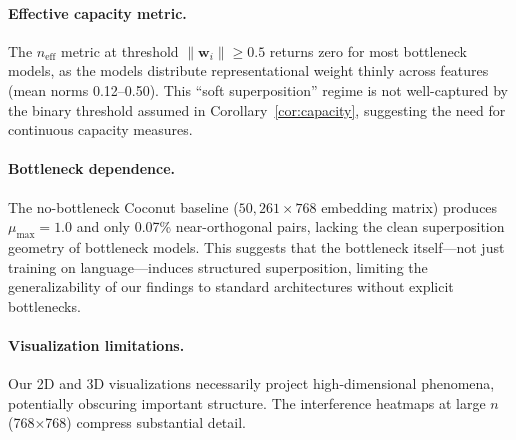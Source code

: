 \paragraph{Effective capacity metric.} The $n_{\text{eff}}$ metric at threshold $\|\mathbf{w}_i\| \geq 0.5$ returns zero for most bottleneck models, as the models distribute representational weight thinly across features (mean norms 0.12--0.50). This ``soft superposition'' regime is not well-captured by the binary threshold assumed in Corollary~\ref{cor:capacity}, suggesting the need for continuous capacity measures.

\paragraph{Bottleneck dependence.} The no-bottleneck Coconut baseline ($50{,}261 \times 768$ embedding matrix) produces $\mu_{\max} = 1.0$ and only 0.07\% near-orthogonal pairs, lacking the clean superposition geometry of bottleneck models. This suggests that the bottleneck itself---not just training on language---induces structured superposition, limiting the generalizability of our findings to standard architectures without explicit bottlenecks.

\paragraph{Visualization limitations.} Our 2D and 3D visualizations necessarily project high-dimensional phenomena, potentially obscuring important structure. The interference heatmaps at large $n$ (768$\times$768) compress substantial detail.
